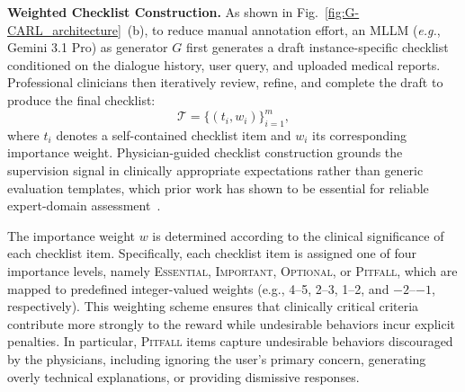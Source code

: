 \documentclass[letterpaper]{article} %
\begin{document}

\vspace{2pt}
\noindent \textbf{Weighted Checklist Construction.}
As shown in Fig.~\ref{fig:G-CARL_architecture}~(b), to reduce manual annotation effort, an MLLM (\textit{e.g.}, Gemini 3.1 Pro) as generator $G$ first generates a draft instance-specific checklist conditioned on the dialogue history, user query, and uploaded medical reports. Professional clinicians then iteratively review, refine, and complete the draft to produce the final checklist:
\begin{equation}
\mathcal{T}
=
\{(t_i, w_i)\}_{i=1}^{m},
\end{equation}
where $t_i$ denotes a self-contained checklist item and $w_i$ its corresponding importance weight. 
Physician-guided checklist construction grounds the supervision signal in clinically appropriate expectations rather than generic evaluation templates, which prior work has shown to be essential for reliable expert-domain assessment~\cite{viswanathan2025checklists}.


The importance weight $w$ is determined according to the clinical significance of each checklist item. Specifically, each checklist item is assigned one of four importance levels, namely \textsc{Essential}, \textsc{Important}, \textsc{Optional}, or \textsc{Pitfall}, which are mapped to predefined integer-valued weights (e.g., 4--5, 2--3, 1--2, and $-2$--$-1$, respectively). This weighting scheme ensures that clinically critical criteria contribute more strongly to the reward while undesirable behaviors incur explicit penalties.
In particular, \textsc{Pitfall} items capture undesirable behaviors discouraged by the physicians, including ignoring the user's primary concern, generating overly technical explanations, or providing dismissive responses. 
\end{document}
